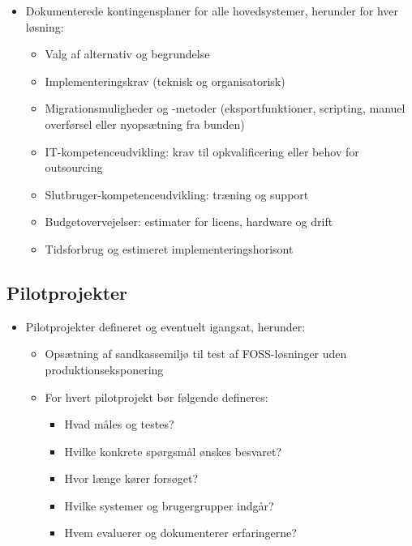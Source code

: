 \documentclass[a4paper,11pt]{book}
\begin{document}
\begin{itemize}
\item
  Dokumenterede kontingensplaner for alle hovedsystemer, herunder for
  hver løsning:

  \begin{itemize}
  \tightlist
  \item
    Valg af alternativ og begrundelse
  \item
    Implementeringskrav (teknisk og organisatorisk)
  \item
    Migrationsmuligheder og -metoder (eksportfunktioner, scripting,
    manuel overførsel eller nyopsætning fra bunden)
  \item
    IT-kompetenceudvikling: krav til opkvalificering eller behov for
    outsourcing
  \item
    Slutbruger-kompetenceudvikling: træning og support
  \item
    Budgetovervejelser: estimater for licens, hardware og drift
  \item
    Tidsforbrug og estimeret implementeringshorisont
  \end{itemize}
\end{itemize}

\subsection{Pilotprojekter}\label{pilotprojekter}

\begin{itemize}
\item
  Pilotprojekter defineret og eventuelt igangsat, herunder:

  \begin{itemize}
  \item
    Opsætning af sandkassemiljø til test af FOSS-løsninger uden
    produktionseksponering
  \item
    For hvert pilotprojekt bør følgende defineres:

    \begin{itemize}
    \tightlist
    \item
      Hvad måles og testes?
    \item
      Hvilke konkrete spørgsmål ønskes besvaret?
    \item
      Hvor længe kører forsøget?
    \item
      Hvilke systemer og brugergrupper indgår?
    \item
      Hvem evaluerer og dokumenterer erfaringerne?
    \end{itemize}
  \end{itemize}
\end{itemize}
\end{document}
